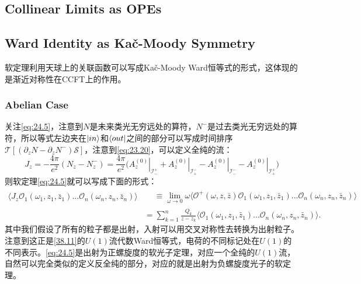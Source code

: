 \subsection{Collinear Limits as OPEs}
\subsection{Ward Identity as Ka\v{c}-Moody Symmetry}
软定理利用天球上的关联函数可以写成Ka\v{c}-Moody Ward恒等式的形式，这体现的是渐近对称性在CCFT上的作用。
\subsubsection{Abelian Case}
关注\ref{eq:24.5}，注意到$N$是未来类光无穷远处的算符，$N^-$是过去类光无穷远处的算符，所以等式左边夹在$\ket{in}$和$\bra{out}$之间的部分可以写成时间排序$\mathcal{T}\left[\left(\partial_zN-\partial_zN^-\right)\mathcal{S}\right]$，注意到\ref{eq:23.20}，可以定义全纯的流：
\begin{equation}
	J_z=-\frac{4\pi}{e^2}\left(N_z-N_z^-\right)=\frac{4\pi}{e^2}\bigl(\left.A_z^{(0)}\right|_{\mathcal{I}_-^+}+\left.A_z^{(0)}\right|_{\mathcal{I}_+^-}-\left.A_z^{(0)}\right|_{\mathcal{I}_-^-}-\left.A_z^{(0)}\right|_{\mathcal{I}_+^+}\bigr)
\end{equation}
则软定理\ref{eq:24.5}就可以写成下面的形式：
\begin{equation}
	\begin{aligned}
		\langle J_z\mathcal{O}_1(\omega_1,z_1,\bar{z}_1)...\mathcal{O}_n(\omega_n,z_n,\bar{z}_n)\rangle & \begin{aligned}&\equiv\lim_{\omega\to0}\omega\langle\mathcal{O}^+(\omega,z,\bar{z})\mathcal{O}_1(\omega_1,z_1,\bar{z}_1)...\mathcal{O}_n(\omega_n,z_n,\bar{z}_n)\rangle\end{aligned}  \\
		&=\sum_{k=1}^n\frac{Q_k}{z-z_k}\langle\mathcal{O}_1(\omega_1,z_1,\bar{z}_1)...\mathcal{O}_n(\omega_n,z_n,\bar{z}_n)\rangle.
	\end{aligned}
\end{equation}
其中我们假设了所有的粒子都是出射，入射可以用交叉对称性去转换为出射粒子。注意到这正是\ref{38.11}的$U(1)$流代数Ward恒等式，电荷的不同标记处在$U(1)$的不同表示。\ref{eq:24.5}是出射为正螺旋度的软光子定理，对应一个全纯的$U(1)$流，自然可以完全类似的定义反全纯的部分，对应的就是出射为负螺旋度光子的软定理。

